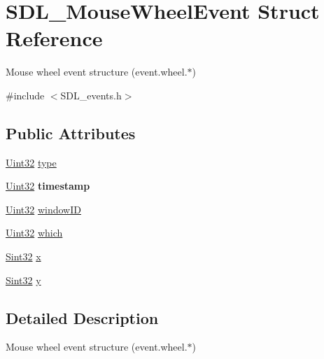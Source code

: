 \hypertarget{struct_s_d_l___mouse_wheel_event}{}\section{S\+D\+L\+\_\+\+Mouse\+Wheel\+Event Struct Reference}
\label{struct_s_d_l___mouse_wheel_event}


Mouse wheel event structure (event.\+wheel.$\ast$)  




{\ttfamily \#include $<$S\+D\+L\+\_\+events.\+h$>$}

\subsection*{Public Attributes}
\begin{DoxyCompactItemize}
\item 
\hyperlink{_s_d_l__stdinc_8h_add440eff171ea5f55cb00c4a9ab8672d}{Uint32} \hyperlink{struct_s_d_l___mouse_wheel_event_aa6b741e99df708c6f9550ee0f520fb70}{type}
\item 
\hypertarget{struct_s_d_l___mouse_wheel_event_a83ad52c80ff49a8e75dc6c33bba65fa0}{}\hyperlink{_s_d_l__stdinc_8h_add440eff171ea5f55cb00c4a9ab8672d}{Uint32} {\bfseries timestamp}\label{struct_s_d_l___mouse_wheel_event_a83ad52c80ff49a8e75dc6c33bba65fa0}

\item 
\hyperlink{_s_d_l__stdinc_8h_add440eff171ea5f55cb00c4a9ab8672d}{Uint32} \hyperlink{struct_s_d_l___mouse_wheel_event_ab45eb1895217214ecb773fc555e08f6c}{window\+I\+D}
\item 
\hyperlink{_s_d_l__stdinc_8h_add440eff171ea5f55cb00c4a9ab8672d}{Uint32} \hyperlink{struct_s_d_l___mouse_wheel_event_a014dc767d52e8b75ba26a5f12e1704e8}{which}
\item 
\hyperlink{_s_d_l__stdinc_8h_a7a90b941db9d4582e9ad7abb9940ff7e}{Sint32} \hyperlink{struct_s_d_l___mouse_wheel_event_a6d904eef474ea45a5b1828fcb5b0f859}{x}
\item 
\hyperlink{_s_d_l__stdinc_8h_a7a90b941db9d4582e9ad7abb9940ff7e}{Sint32} \hyperlink{struct_s_d_l___mouse_wheel_event_a53fdf77a464426bc8b30e629795f044b}{y}
\end{DoxyCompactItemize}


\subsection{Detailed Description}
Mouse wheel event structure (event.\+wheel.$\ast$) 

